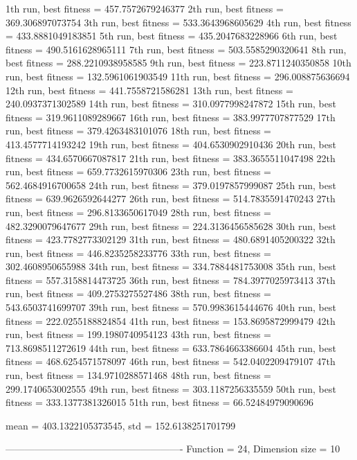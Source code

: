 1th run, best fitness = 457.7572679246377
2th run, best fitness = 369.306897073754
3th run, best fitness = 533.3643968605629
4th run, best fitness = 433.8881049183851
5th run, best fitness = 435.2047683228966
6th run, best fitness = 490.5161628965111
7th run, best fitness = 503.5585290320641
8th run, best fitness = 288.2210938958585
9th run, best fitness = 223.8711240350858
10th run, best fitness = 132.5961061903549
11th run, best fitness = 296.008875636694
12th run, best fitness = 441.7558721586281
13th run, best fitness = 240.0937371302589
14th run, best fitness = 310.0977998247872
15th run, best fitness = 319.9611089289667
16th run, best fitness = 383.9977707877529
17th run, best fitness = 379.4263483101076
18th run, best fitness = 413.4577714193242
19th run, best fitness = 404.6530902910436
20th run, best fitness = 434.6570667087817
21th run, best fitness = 383.3655511047498
22th run, best fitness = 659.7732615970306
23th run, best fitness = 562.4684916700658
24th run, best fitness = 379.0197857999087
25th run, best fitness = 639.9626592644277
26th run, best fitness = 514.7835591470243
27th run, best fitness = 296.8133650617049
28th run, best fitness = 482.3290079647677
29th run, best fitness = 224.3136456585628
30th run, best fitness = 423.7782773302129
31th run, best fitness = 480.6891405200322
32th run, best fitness = 446.8235258233776
33th run, best fitness = 302.4608950655988
34th run, best fitness = 334.7884481753008
35th run, best fitness = 557.3158814473725
36th run, best fitness = 784.3977025973413
37th run, best fitness = 409.2753275527486
38th run, best fitness = 543.6503741699707
39th run, best fitness = 570.9983615444676
40th run, best fitness = 222.0255188824854
41th run, best fitness = 153.8695872999479
42th run, best fitness = 199.1980740954123
43th run, best fitness = 713.8698511272619
44th run, best fitness = 633.7864663386604
45th run, best fitness = 468.6254571578097
46th run, best fitness = 542.0402209479107
47th run, best fitness = 134.9710288571468
48th run, best fitness = 299.1740653002555
49th run, best fitness = 303.1187256335559
50th run, best fitness = 333.1377381326015
51th run, best fitness = 66.52484979090696

mean = 403.1322105373545, std = 152.6138251701799

-------------------------------------------------------
Function = 24, Dimension size = 10

